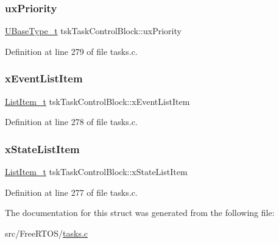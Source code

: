 \subsubsection{\texorpdfstring{ux\+Priority}{uxPriority}}
{\footnotesize\ttfamily \hyperlink{portmacro_8h_a646f89d4298e4f5afd522202b11cb2e6}{U\+Base\+Type\+\_\+t} tsk\+Task\+Control\+Block\+::ux\+Priority}



Definition at line 279 of file tasks.\+c.

\mbox{\label{structtsk_task_control_block_a1a1612b6081a13683808284d93a9b28f}} 
\subsubsection{\texorpdfstring{x\+Event\+List\+Item}{xEventListItem}}
{\footnotesize\ttfamily \hyperlink{list_8h_a1a62d469392f9bfe2443e7efab9c8398}{List\+Item\+\_\+t} tsk\+Task\+Control\+Block\+::x\+Event\+List\+Item}



Definition at line 278 of file tasks.\+c.

\mbox{\label{structtsk_task_control_block_a16e0d20425d53ac78537e1fdb8834cf6}} 
\subsubsection{\texorpdfstring{x\+State\+List\+Item}{xStateListItem}}
{\footnotesize\ttfamily \hyperlink{list_8h_a1a62d469392f9bfe2443e7efab9c8398}{List\+Item\+\_\+t} tsk\+Task\+Control\+Block\+::x\+State\+List\+Item}



Definition at line 277 of file tasks.\+c.



The documentation for this struct was generated from the following file\+:\begin{DoxyCompactItemize}
\item 
src/\+Free\+R\+T\+O\+S/\hyperlink{tasks_8c}{tasks.\+c}\end{DoxyCompactItemize}

